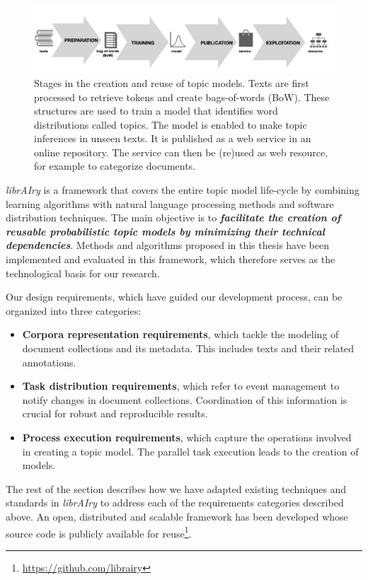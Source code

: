 \begin{figure}
  \center
  \includegraphics[scale=0.21]{life-cycle.png}
  \caption{Stages in the creation and reuse of topic models. Texts are first processed to retrieve tokens and create bags-of-words (BoW). These structures are used to train a model that identifies word distributions called topics. The model is enabled to make topic inferences in unseen texts. It is published as a web service in an online repository. The service can then be (re)used as web resource, for example to categorize documents.}
  \label{fig:life-cycle}
\end{figure}


\textit{librAIry} is a framework that covers the entire topic model life-cycle by combining learning algorithms with natural language processing methods and software distribution techniques. The main objective is to \textbf{\textit{facilitate the creation of reusable probabilistic topic models by minimizing their technical dependencies}}. Methods and algorithms proposed in this thesis have been implemented and evaluated in this framework, which therefore serves as the technological basis for our research.

Our design requirements, which have guided our development process, can be organized into three categories:
\begin{itemize}
\item \textbf{Corpora representation requirements}, which tackle the modeling of document collections and its metadata. This includes texts and their related annotations.
\item \textbf{Task distribution requirements}, which refer to event management to notify changes in document collections. Coordination of this information is crucial for robust and reproducible results.  
\item \textbf{Process execution requirements}, which capture the operations involved in creating a topic model. The parallel task execution leads to the creation of models.
\end{itemize}

The rest of the section describes how we have adapted existing techniques and standards in \textit{librAIry} to address each of the requirements categories described above. An open, distributed and scalable framework has been developed whose source code is publicly available for reuse\footnote{\url{https://github.com/librairy}}.

